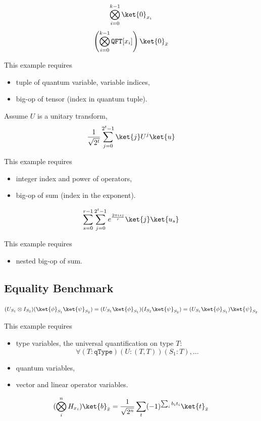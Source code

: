 \begin{example}
  $$
  \bigotimes_{i = 0}^{k-1} \ket{0}_{x_i}
  $$
  $$
  \left ( \bigotimes_{i = 0}^{k-1} \texttt{QFT}[x_i] \right ) \ket{0}_{\bar{x}}
  $$
\end{example}
This example requires 
\begin{itemize}
  \item tuple of quantum variable, variable indices,
  \item big-op of tensor (index in quantum tuple).
\end{itemize}

\begin{example}
  Assume $U$ is a unitary transform,
  $$
  \frac{1}{\sqrt{2^t}} \sum_{j=0}^{2^t-1} \ket{j} U^j \ket{u}
  $$
\end{example}
This example requires
\begin{itemize}
  \item integer index and power of operators,
  \item big-op of sum (index in the exponent).
\end{itemize}

\begin{example}
  $$
  \sum_{s=0}^{r-1} \sum_{j=0}^{2^t-1} e^{\frac{2\pi i s j}{r}} \ket{j} \ket{u_s}
  $$
\end{example}
This example requires
\begin{itemize}
  \item nested big-op of sum.
\end{itemize}


\subsection{Equality Benchmark}

\begin{example}
  $$
  (U_{S_1} \otimes I_{S_2}) (\ket{\phi}_{S_1} \ket{\psi}_{S_2}) = (U_{S_1} \ket{\phi}_{S_1}) (I_{S_2}\ket{\psi}_{S_2}) = (U_{S_1} \ket{\phi}_{S_1}) \ket{\psi}_{S_2}
  $$
\end{example}
This example requires 
\begin{itemize}
  \item type variables, the universal quantification on type $T$:
    $$
    \forall (T : \texttt{qType}) (U : (T, T)) (S_1 : T), \dots
    $$
  \item quantum variables,
  \item vector and linear operator variables.
\end{itemize}

\begin{example} [ParaHadamard]
  $$
  (\bigotimes_i^n H_{x_i}) \ket{b}_{\bar{x}} = \frac{1}{\sqrt{2^n}} \sum_t (-1)^{\sum_i b_i t_i} \ket{t}_{\bar{x}}
  $$
\end{example}
